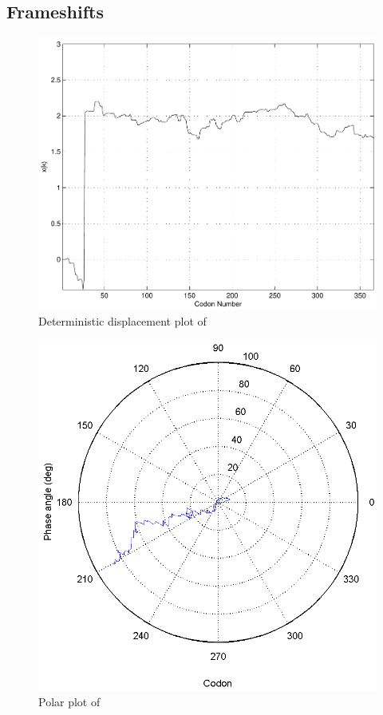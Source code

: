 \documentclass[12pt, draft]{article}
\numberwithin{equation}{section}
\begin{document}
\subsection{Frameshifts}
\label{section:frameshifts}

\begin{figure}
  \centering
  \caption{Deterministic displacement plot of~\prfB}
  \label{prfB:deterministic}
  \includegraphics[scale=0.4]{prfB/deterministic}
\end{figure}

\begin{figure}
  \centering
  \caption{Polar plot of \prfB}
  \label{prfB:polar}
  \includegraphics[scale=0.5]{prfB/polar}
\end{figure}
\end{document}
